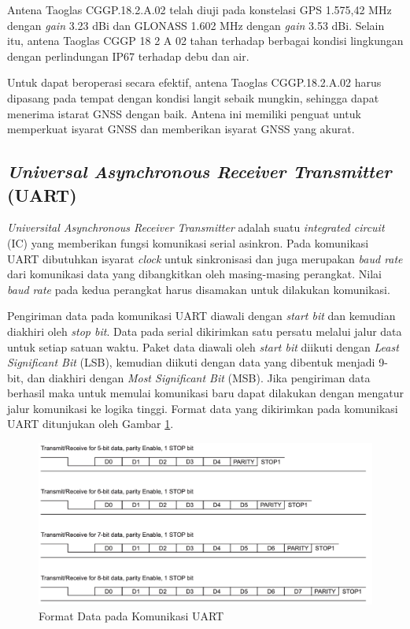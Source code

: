 Antena Taoglas CGGP.18.2.A.02 telah diuji pada konstelasi GPS 1.575,42 MHz dengan \textit{gain} 3.23 dBi dan GLONASS 1.602 MHz dengan \textit{gain} 3.53 dBi. Selain itu, antena Taoglas CGGP 18 2 A 02 tahan terhadap berbagai kondisi lingkungan dengan perlindungan IP67 terhadap debu dan air.

Untuk dapat beroperasi secara efektif, antena Taoglas CGGP.18.2.A.02 harus dipasang pada tempat dengan kondisi langit sebaik mungkin, sehingga dapat menerima istarat GNSS dengan baik. Antena ini memiliki penguat untuk memperkuat isyarat GNSS dan memberikan isyarat GNSS yang akurat.

\subsection{\textit{Universal Asynchronous Receiver Transmitter} (UART)}
\textit{Universital Asynchronous Receiver Transmitter} adalah suatu \textit{integrated circuit} (IC) yang memberikan fungsi komunikasi serial asinkron. Pada komunikasi UART dibutuhkan isyarat \textit{clock} untuk sinkronisasi dan juga merupakan \textit{baud rate} dari komunikasi data yang dibangkitkan oleh masing-masing perangkat. Nilai \textit{baud rate} pada kedua perangkat harus disamakan untuk dilakukan komunikasi.

 Pengiriman data pada komunikasi UART diawali dengan \textit{start bit} dan kemudian diakhiri oleh \textit{stop bit}. Data pada serial dikirimkan satu persatu melalui jalur data untuk setiap satuan waktu. Paket data diawali oleh \textit{start bit} diikuti dengan \textit{Least Significant Bit} (LSB), kemudian diikuti dengan data yang dibentuk menjadi 9-bit, dan diakhiri dengan \textit{Most Significant Bit} (MSB). Jika pengiriman data berhasil maka untuk memulai komunikasi baru dapat dilakukan dengan mengatur jalur komunikasi ke logika tinggi. Format data yang dikirimkan pada komunikasi UART ditunjukan oleh Gambar \ref{Fig: uart-format}.

\begin{figure}[ht]
	\centering
	\includegraphics[width=12cm]{contents/chapter-2/uart-format.png}
	\caption{Format Data pada Komunikasi UART}
	\label{Fig: uart-format}
\end{figure}

